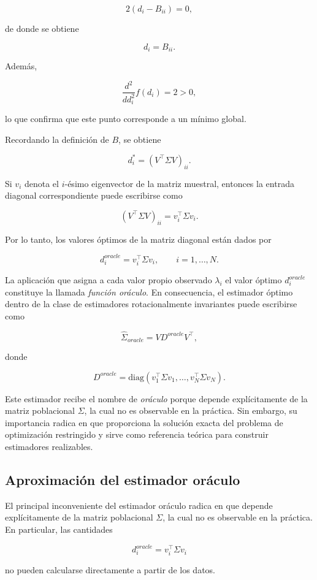 \documentclass[letterpaper,12pt,oneside]{book}
\begin{document}
\[
2(d_i - B_{ii}) = 0,
\]

de donde se obtiene

\[
d_i = B_{ii}.
\]

Además,

\[
\frac{d^2}{d d_i^2} f(d_i) = 2 > 0,
\]

lo que confirma que este punto corresponde a un mínimo global.

Recordando la definición de $B$, se obtiene

\[
d_i^* = (V^\top \Sigma V)_{ii}.
\]

Si $v_i$ denota el $i$-ésimo eigenvector de la matriz muestral, entonces la entrada diagonal correspondiente puede escribirse como

\[
(V^\top \Sigma V)_{ii}=v_i^\top \Sigma v_i.
\]

Por lo tanto, los valores óptimos de la matriz diagonal están dados por

\[
d_i^{oracle}=v_i^\top \Sigma v_i,
\qquad i=1,\dots,N.
\]

La aplicación que asigna a cada valor propio observado $\lambda_i$ el valor óptimo $d_i^{oracle}$ constituye la llamada \textit{función oráculo}. En consecuencia, el estimador óptimo dentro de la clase de estimadores rotacionalmente invariantes puede escribirse como

\[
\hat{\Sigma}_{oracle}
=
V D^{oracle} V^\top,
\]

donde

\[
D^{oracle}
=
\mathrm{diag}(v_1^\top\Sigma v_1,\dots,v_N^\top\Sigma v_N).
\]

Este estimador recibe el nombre de \textit{oráculo} porque depende explícitamente de la matriz poblacional $\Sigma$, la cual no es observable en la práctica. Sin embargo, su importancia radica en que proporciona la solución exacta del problema de optimización restringido y sirve como referencia teórica para construir estimadores realizables.

\subsection*{Aproximación del estimador oráculo}

El principal inconveniente del estimador oráculo radica en que depende explícitamente de la matriz poblacional $\Sigma$, la cual no es observable en la práctica. En particular, las cantidades

\[
d_i^{oracle}=v_i^\top \Sigma v_i
\]

no pueden calcularse directamente a partir de los datos.
\end{document}
